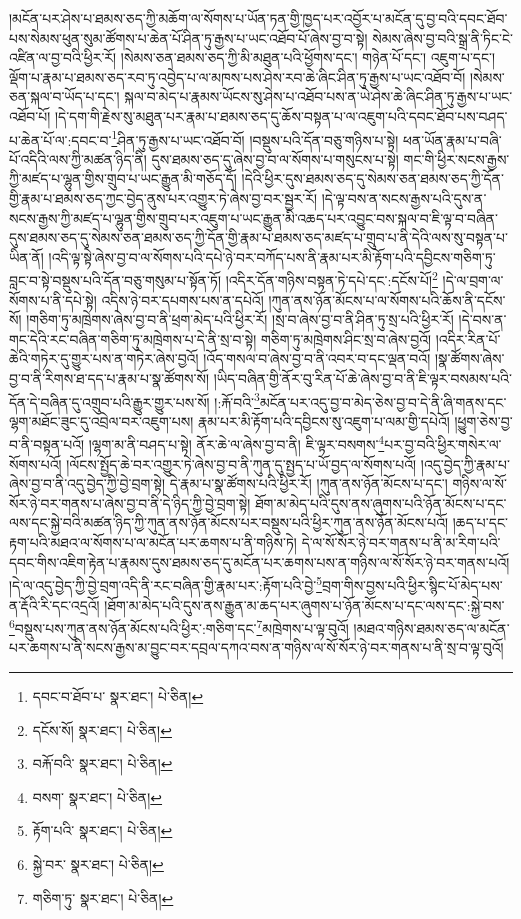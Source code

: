 །མངོན་པར་ཤེས་པ་ཐམས་ཅད་ཀྱི་མཆོག་ལ་སོགས་པ་ཡོན་ཏན་གྱི་ཁྱད་པར་འབྱོར་པ་མངོན་དུ་བྱ་བའི་དབང་ཐོབ་པས་སེམས་ཕུན་སུམ་ཚོགས་པ་ཆེན་པོ་ཤིན་ཏུ་རྒྱས་པ་ཡང་འཐོབ་པོ་ཞེས་བྱ་བ་སྟེ། སེམས་ཞེས་བྱ་བའི་སྒྲ་ནི་ཏིང་ངེ་འཛིན་ལ་བྱ་བའི་ཕྱིར་རོ། །སེམས་ཅན་ཐམས་ཅད་ཀྱི་མི་མཐུན་པའི་ཕྱོགས་དང་། གཉེན་པོ་དང་། འཇུག་པ་དང་། ལྡོག་པ་རྣམ་པ་ཐམས་ཅད་རབ་ཏུ་འབྱེད་པ་ལ་མཁས་པས་ཤེས་རབ་ཆེ་ཞིང་ཤིན་ཏུ་རྒྱས་པ་ཡང་འཐོབ་བོ། །སེམས་ཅན་སྐལ་བ་ཡོད་པ་དང་། སྐལ་བ་མེད་པ་རྣམས་ཡོངས་སུ་ཤེས་པ་འཐོབ་པས་ན་ཡེ་ཤེས་ཆེ་ཞིང་ཤིན་ཏུ་རྒྱས་པ་ཡང་འཐོབ་པོ། །དེ་དག་གི་རྗེས་སུ་མཐུན་པར་རྣམ་པ་ཐམས་ཅད་དུ་ཆོས་བསྟན་པ་ལ་འཇུག་པའི་དབང་ཐོབ་པས་བཤད་པ་ཆེན་པོ་ལ་:དབང་བ་\footnote{དབང་བ་ཐོབ་པ་  སྣར་ཐང་།  པེ་ཅིན། }ཤིན་ཏུ་རྒྱས་པ་ཡང་འཐོབ་བོ། །བསྡུས་པའི་དོན་བཅུ་གཉིས་པ་སྟེ། ཕན་ཡོན་རྣམ་པ་བཞི་པོ་འདིའི་ལས་ཀྱི་མཚན་ཉིད་ནི། དུས་ཐམས་ཅད་དུ་ཞེས་བྱ་བ་ལ་སོགས་པ་གསུངས་པ་སྟེ། གང་གི་ཕྱིར་སངས་རྒྱས་ཀྱི་མཛད་པ་ལྷུན་གྱིས་གྲུབ་པ་ཡང་རྒྱུན་མི་གཅོད་དོ། །དེའི་ཕྱིར་དུས་ཐམས་ཅད་དུ་སེམས་ཅན་ཐམས་ཅད་ཀྱི་དོན་གྱི་རྣམ་པ་ཐམས་ཅད་ཀྱང་བྱེད་ནུས་པར་འགྱུར་ཏེ་ཞེས་བྱ་བར་སྦྱར་རོ། །དེ་ལྟ་བས་ན་སངས་རྒྱས་པའི་དུས་ན་སངས་རྒྱས་ཀྱི་མཛད་པ་ལྷུན་གྱིས་གྲུབ་པར་འཇུག་པ་ཡང་རྒྱུན་མི་འཆད་པར་འབྱུང་བས་སྐལ་བ་ཇི་ལྟ་བ་བཞིན་དུས་ཐམས་ཅད་དུ་སེམས་ཅན་ཐམས་ཅད་ཀྱི་དོན་གྱི་རྣམ་པ་ཐམས་ཅད་མཛད་པ་གྲུབ་པ་ནི་དེའི་ལས་སུ་བསྟན་པ་ཡིན་ནོ། །འདི་ལྟ་སྟེ་ཞེས་བྱ་བ་ལ་སོགས་པའི་དཔེ་ཉེ་བར་བཀོད་པས་ནི་རྣམ་པར་མི་རྟོག་པའི་དབྱིངས་གཅིག་ཏུ་བླང་བ་སྟེ་བསྡུས་པའི་དོན་བཅུ་གསུམ་པ་སྟོན་ཏོ། །འདིར་དོན་གཉིས་བསྟན་ཏེ་དཔེ་དང་:དངོས་པོ།\footnote{དངོས་སོ།  སྣར་ཐང་།  པེ་ཅིན། } །དེ་ལ་བྲག་ལ་སོགས་པ་ནི་དཔེ་སྟེ། འདིས་ཉེ་བར་དཔགས་པས་ན་དཔེའོ། །ཀུན་ནས་ཉོན་མོངས་པ་ལ་སོགས་པའི་ཆོས་ནི་དངོས་སོ། །གཅིག་ཏུ་མཁྲེགས་ཞེས་བྱ་བ་ནི་ཕྲག་མེད་པའི་ཕྱིར་རོ། །སྲ་བ་ཞེས་བྱ་བ་ནི་ཤིན་ཏུ་སྲ་པའི་ཕྱིར་རོ། །དེ་བས་ན་གང་དེའི་རང་བཞིན་གཅིག་ཏུ་མཁྲེགས་པ་དེ་ནི་སྲ་བ་སྟེ། གཅིག་ཏུ་མཁྲེགས་ཤིང་སྲ་བ་ཞེས་བྱའོ། །འདིར་རིན་པོ་ཆེའི་གཏེར་དུ་གྱུར་པས་ན་གཏེར་ཞེས་བྱའོ། །འོད་གསལ་བ་ཞེས་བྱ་བ་ནི་འབར་བ་དང་ལྡན་བའོ། །སྣ་ཚོགས་ཞེས་བྱ་བ་ནི་རིགས་ཐ་དད་པ་རྣམ་པ་སྣ་ཚོགས་སོ། །ཡིད་བཞིན་གྱི་ནོར་བུ་རིན་པོ་ཆེ་ཞེས་བྱ་བ་ནི་ཇི་ལྟར་བསམས་པའི་དོན་དེ་བཞིན་དུ་འགྲུབ་པའི་རྒྱུར་གྱུར་པས་སོ། །:རྐོ་བའི་\footnote{བརྐོ་བའི་  སྣར་ཐང་།  པེ་ཅིན། }མངོན་པར་འདུ་བྱ་བ་མེད་ཅེས་བྱ་བ་དེ་ནི་ཞི་གནས་དང་ལྷག་མཐོང་ཟུང་དུ་འབྲེལ་བར་འཇུག་པས། རྣམ་པར་མི་རྟོག་པའི་དབྱིངས་སུ་འཇུག་པ་ལམ་གྱི་དཔེའོ། །ཕྱུག་ཅེས་བྱ་བ་ནི་བསྟན་པའོ། །ལྷག་མ་ནི་བཤད་པ་སྟེ། ནོར་ཆེ་ལ་ཞེས་བྱ་བ་ནི། ཇི་ལྟར་བསགས་\footnote{བསག་  སྣར་ཐང་།  པེ་ཅིན། }པར་བྱ་བའི་ཕྱིར་གསེར་ལ་སོགས་པའོ། །ལོངས་སྤྱོད་ཆེ་བར་འགྱུར་ཏེ་ཞེས་བྱ་བ་ནི་ཀུན་དུ་སྤྱད་པ་ཡོ་བྱད་ལ་སོགས་པའོ། །འདུ་བྱེད་ཀྱི་རྣམ་པ་ཞེས་བྱ་བ་ནི་འདུ་བྱེད་ཀྱི་བྱེ་བྲག་སྟེ། དེ་རྣམ་པ་སྣ་ཚོགས་པའི་ཕྱིར་རོ། །ཀུན་ནས་ཉོན་མོངས་པ་དང་། གཉིས་ལ་སོ་སོར་ཉེ་བར་གནས་པ་ཞེས་བྱ་བ་ནི་དེ་ཉིད་ཀྱི་བྱེ་བྲག་སྟེ། ཐོག་མ་མེད་པའི་དུས་ནས་ཞུགས་པའི་ཉོན་མོངས་པ་དང་ལས་དང་སྐྱེ་བའི་མཚན་ཉིད་ཀྱི་ཀུན་ནས་ཉོན་མོངས་པར་བསྡུས་པའི་ཕྱིར་ཀུན་ནས་ཉོན་མོངས་པའོ། །ཆད་པ་དང་རྟག་པའི་མཐའ་ལ་སོགས་པ་ལ་མངོན་པར་ཆགས་པ་ནི་གཉིས་ཏེ། དེ་ལ་སོ་སོར་ཉེ་བར་གནས་པ་ནི་མ་རིག་པའི་དབང་གིས་འཇིག་རྟེན་པ་རྣམས་དུས་ཐམས་ཅད་དུ་མངོན་པར་ཆགས་པས་ན་གཉིས་ལ་སོ་སོར་ཉེ་བར་གནས་པའོ། །དེ་ལ་འདུ་བྱེད་ཀྱི་བྱེ་བྲག་འདི་ནི་རང་བཞིན་གྱི་རྣམ་པར་:རྟོག་པའི་བྱེ་\footnote{རྟོག་པའི་  སྣར་ཐང་།  པེ་ཅིན། }བྲག་གིས་བྱས་པའི་ཕྱིར་སྙིང་པོ་མེད་པས་ན་རྡོའི་རི་དང་འདྲའོ། །ཐོག་མ་མེད་པའི་དུས་ནས་རྒྱུན་མ་ཆད་པར་ཞུགས་པ་ཉོན་མོངས་པ་དང་ལས་དང་:སྐྱེ་བས་\footnote{སྐྱེ་བར་  སྣར་ཐང་།  པེ་ཅིན། }བསྡུས་པས་ཀུན་ནས་ཉོན་མོངས་པའི་ཕྱིར་:གཅིག་དང་\footnote{གཅིག་ཏུ་  སྣར་ཐང་།  པེ་ཅིན། }མཁྲེགས་པ་ལྟ་བུའོ། །མཐའ་གཉིས་ཐམས་ཅད་ལ་མངོན་པར་ཆགས་པ་ནི་སངས་རྒྱས་མ་བྱུང་བར་དབྲལ་དཀའ་བས་ན་གཉིས་ལ་སོ་སོར་ཉེ་བར་གནས་པ་ནི་སྲ་བ་ལྟ་བུའོ། 